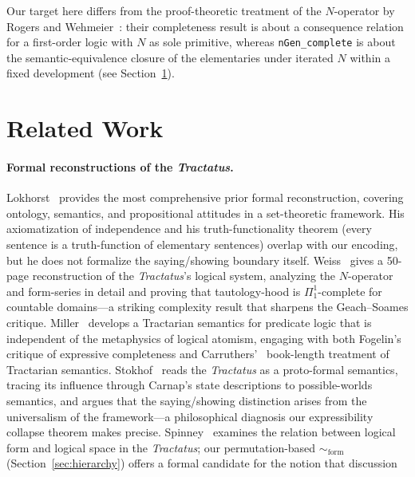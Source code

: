 \documentclass[jsl,bibother]{asl}
\theoremstyle{definition}
\theoremstyle{remark}
\newcommand{\formEq}{\sim_{\mathrm{form}}}
\begin{document}
Our target here differs from the proof-theoretic treatment of
the $N$-operator by Rogers and Wehmeier~\cite{rogers2012}:
their completeness result is about a consequence relation for
a first-order logic with $N$ as sole primitive, whereas
\texttt{nGen\_complete} is about the semantic-equivalence
closure of the elementaries under iterated $N$ within a fixed
development (see Section~\ref{sec:related}).

\section{Related Work}
\label{sec:related}

\paragraph{Formal reconstructions of the \emph{Tractatus}.}
Lokhorst~\cite{lokhorst1988} provides the most comprehensive
prior formal reconstruction, covering ontology, semantics, and
propositional attitudes in a set-theoretic framework.  His
axiomatization of independence and his truth-functionality
theorem (every sentence is a truth-function of elementary
sentences) overlap with our encoding, but he does not formalize
the saying/showing boundary itself.
Weiss~\cite{weiss2017} gives a 50-page reconstruction of the
\emph{Tractatus}'s logical system, analyzing the $N$-operator
and form-series in detail and proving that tautology-hood is
$\Pi^1_1$-complete for countable domains---a striking
complexity result that sharpens the Geach--Soames critique.
Miller~\cite{miller1995} develops a Tractarian semantics for
predicate logic that is independent of the metaphysics of
logical atomism, engaging with both Fogelin's~\cite{fogelin1987}
critique of expressive completeness and Carruthers'~\cite{carruthers1989}
book-length treatment of Tractarian semantics.
Stokhof~\cite{stokhof2008} reads the \emph{Tractatus} as a
proto-formal semantics, tracing its influence through Carnap's
state descriptions to possible-worlds semantics, and argues
that the saying/showing distinction arises from the
universalism of the framework---a philosophical diagnosis our
expressibility collapse theorem makes precise.
Spinney~\cite{spinney2022} examines the relation between logical
form and logical space in the \emph{Tractatus}; our
permutation-based $\formEq$ (Section~\ref{sec:hierarchy})
offers a formal candidate for the notion that discussion
\end{document}
